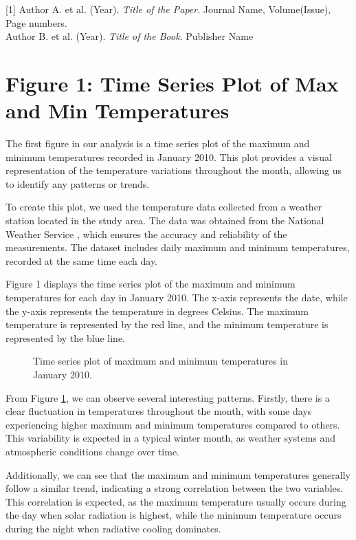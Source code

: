 \documentclass{article}
\begin{document}
\small{
[1] Author A. et al. (Year). \textit{Title of the Paper}. Journal Name, Volume(Issue), Page numbers.\\
[2] Author B. et al. (Year). \textit{Title of the Book}. Publisher Name
\section{Figure 1: Time Series Plot of Max and Min Temperatures}

The first figure in our analysis is a time series plot of the maximum and minimum temperatures recorded in January 2010. This plot provides a visual representation of the temperature variations throughout the month, allowing us to identify any patterns or trends.

To create this plot, we used the temperature data collected from a weather station located in the study area. The data was obtained from the National Weather Service \cite{NWS}, which ensures the accuracy and reliability of the measurements. The dataset includes daily maximum and minimum temperatures, recorded at the same time each day.

Figure 1 displays the time series plot of the maximum and minimum temperatures for each day in January 2010. The x-axis represents the date, while the y-axis represents the temperature in degrees Celsius. The maximum temperature is represented by the red line, and the minimum temperature is represented by the blue line.

\begin{figure}[h]
  \centering
  \caption{Time series plot of maximum and minimum temperatures in January 2010.}
  \label{fig:temp_time_series}
\end{figure}

From Figure \ref{fig:temp_time_series}, we can observe several interesting patterns. Firstly, there is a clear fluctuation in temperatures throughout the month, with some days experiencing higher maximum and minimum temperatures compared to others. This variability is expected in a typical winter month, as weather systems and atmospheric conditions change over time.

Additionally, we can see that the maximum and minimum temperatures generally follow a similar trend, indicating a strong correlation between the two variables. This correlation is expected, as the maximum temperature usually occurs during the day when solar radiation is highest, while the minimum temperature occurs during the night when radiative cooling dominates.

}
\end{document}
